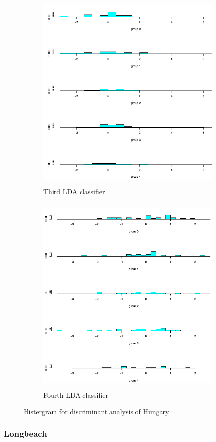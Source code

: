 \documentclass[a4paper]{article}
\begin{document}
\begin{figure}[H]
	\begin{subfigure}{0.5\textwidth}
		\caption{Third LDA classifier}
		\includegraphics[width=0.9\linewidth, height=10cm]{Q4_pics/Hung-Hist3.png}
	\end{subfigure}
	\begin{subfigure}{0.5\textwidth}
		\caption{Fourth LDA classifier}
		\includegraphics[width=0.9\linewidth, height=10cm]{Q4_pics/Hung-Hist4.png}
	\end{subfigure}
	\caption{Histergram for discriminant analysis of Hungary}
	\label{q4_hung_historgrams}
\end{figure}

\newpage
\subsubsection{Longbeach}
\end{document}

